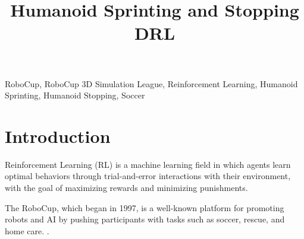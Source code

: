 \documentclass[conference]{IEEEtran}
\begin{document}
\title{Humanoid Sprinting and Stopping DRL\\
}

\author{

    \and

    \and

}


\maketitle

\begin{abstract}



\end{abstract}

\begin{IEEEkeywords}

    RoboCup, RoboCup 3D Simulation League, Reinforcement Learning, Humanoid Sprinting, Humanoid Stopping, Soccer

\end{IEEEkeywords}

\section{Introduction}

Reinforcement Learning (RL) is a machine learning field in which agents learn optimal behaviors through trial-and-error
interactions with their environment, with the goal of maximizing rewards and minimizing punishments.

The RoboCup, which began in 1997, is a well-known platform for promoting robots and AI by pushing participants with tasks such
as soccer, rescue, and home care. \cite{robocup97}.
\end{document}
